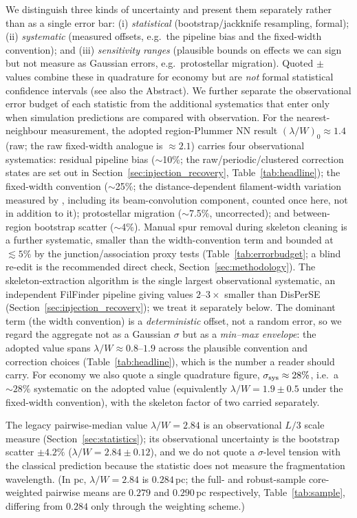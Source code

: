 \documentclass[usenatbib,twoside,twocolumn]{mnras}
\begin{document}
We distinguish three kinds of uncertainty and present them separately rather than as a single error bar: (i) \emph{statistical} (bootstrap/jackknife resampling, formal); (ii) \emph{systematic} (measured offsets, e.g.\ the pipeline bias and the fixed-width convention); and (iii) \emph{sensitivity ranges} (plausible bounds on effects we can sign but not measure as Gaussian errors, e.g.\ protostellar migration). Quoted $\pm$ values combine these in quadrature for economy but are \emph{not} formal statistical confidence intervals (see also the Abstract). We further separate the observational error budget of each statistic from the additional systematics that enter only when simulation predictions are compared with observation. For the nearest-neighbour measurement, the adopted region-Plummer NN result $(\lambda/W)_0\approx1.4$ (raw; the raw fixed-width analogue is $\approx2.1$) carries four observational systematics: residual pipeline bias ($\sim$10\%; the raw/periodic/clustered correction states are set out in Section~\ref{sec:injection_recovery}, Table~\ref{tab:headline}); the fixed-width convention ($\sim$25\%; the distance-dependent filament-width variation measured by \citealt{Panopoulou2022}, including its beam-convolution component, counted once here, not in addition to it); protostellar migration ($\sim$7.5\%, uncorrected); and between-region bootstrap scatter ($\sim$4\%). Manual spur removal during skeleton cleaning is a further systematic, smaller than the width-convention term and bounded at $\lesssim5\%$ by the junction/association proxy tests (Table~\ref{tab:errorbudget}; a blind re-edit is the recommended direct check, Section~\ref{sec:methodology}). The skeleton-extraction algorithm is the single largest observational systematic, an independent FilFinder pipeline giving values $2$--$3\times$ smaller than DisPerSE (Section~\ref{sec:injection_recovery}); we treat it separately below. The dominant term (the width convention) is a \emph{deterministic} offset, not a random error, so we regard the aggregate not as a Gaussian $\sigma$ but as a \emph{min--max envelope}: the adopted value spans $\lambda/W\approx0.8$--$1.9$ across the plausible convention and correction choices (Table~\ref{tab:headline}), which is the number a reader should carry. For economy we also quote a single quadrature figure, $\sigma_{\rm sys}\approx28\%$, i.e.\ a $\sim28\%$ systematic on the adopted value (equivalently $\lambda/W=1.9\pm0.5$ under the fixed-width convention), with the skeleton factor of two carried separately.

The legacy pairwise-median value $\lambda/W=2.84$ is an observational $L/3$ scale measure (Section~\ref{sec:statistics}); its observational uncertainty is the bootstrap scatter $\pm4.2\%$ ($\lambda/W=2.84\pm0.12$), and we do not quote a $\sigma$-level tension with the classical prediction because the statistic does not measure the fragmentation wavelength. (In pc, $\lambda/W=2.84$ is $0.284$\,pc; the full- and robust-sample core-weighted pairwise means are $0.279$ and $0.290$\,pc respectively, Table~\ref{tab:sample}, differing from $0.284$ only through the weighting scheme.)
\end{document}
